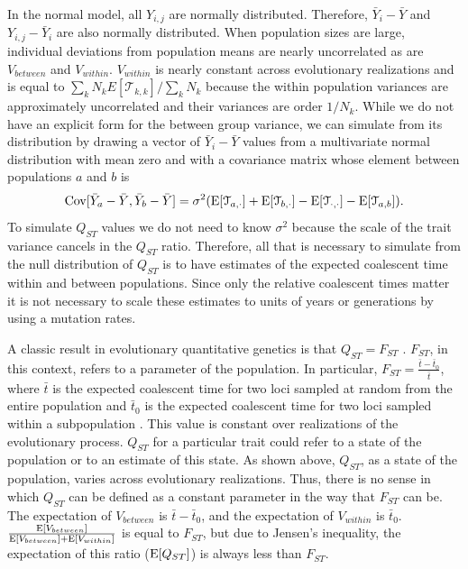 In the normal model, all $Y_{i,j}$ are normally distributed. Therefore,
$\bar{Y}_{i} - \bar{Y}$ and $Y_{i,j} - \bar{Y}_i$ are also normally distributed.
When population sizes are large, individual deviations from population means are
nearly uncorrelated as are $V_{between}$ and $V_{within}$. $V_{within}$ is
nearly constant across evolutionary realizations and is equal to $\sum_k N_k
E[\mathcal{T}_{k,k}] / \sum_k N_k$ because the within population variances are
approximately uncorrelated and their variances are order $1/N_k$. While we do
not have an explicit form for the between group variance, we can simulate from
its distribution by drawing a vector of $\bar{Y}_{i} - \bar{Y}$ values from a
multivariate normal distribution with mean zero and with a covariance matrix
whose element between populations $a$ and $b$ is 
\begin{equation}
  \mathrm{Cov}[\bar{Y}_{a} - \bar{Y}, \bar{Y}_{b} - \bar{Y}] =
  \sigma^2(\mathrm{E}[\mathcal{T}_{a,\cdot}] + \mathrm{E}[\mathcal{T}_{b,\cdot}] -
  \mathrm{E}[\mathcal{T}_{\cdot,\cdot}] - \mathrm{E}[\mathcal{T}_{a,b}]).
\end{equation}
To simulate $Q_{ST}$ values we do not need to know $\sigma^2$ because the scale
of the trait variance cancels in the $Q_{ST}$ ratio. Therefore, all that is
necessary to simulate from the null distribution of $Q_{ST}$ is to have
estimates of the expected coalescent time within and between populations. Since
only the relative coalescent times matter it is not necessary to scale these
estimates to units of years or generations by using a mutation rates.

A classic result in evolutionary quantitative genetics is that $Q_{ST}=F_{ST}$
\citep{Whitlock1999}. $F_{ST}$, in this context, refers to a parameter of the
population. In particular, $F_{ST} = \frac{\bar{t} - \bar{t}_0}{\bar{t}}$, where
$\bar{t}$ is the expected coalescent time for two loci sampled at random from
the entire population and $\bar{t}_0$ is the expected coalescent time for two
loci sampled within a subpopulation \citep{Slatkin1991}. This value is constant
over realizations of the evolutionary process. $Q_{ST}$ for a particular trait
could refer to a state of the population or to an estimate of this state. As
shown above, $Q_{ST}$, as a state of the population, varies across evolutionary
realizations. Thus, there is no sense in which $Q_{ST}$ can be defined as a
constant parameter in the way that $F_{ST}$ can be. The expectation of
$V_{between}$ is $\bar{t} - \bar{t}_0$, and the expectation of $V_{within}$ is
$\bar{t}_0$. $\frac{\mathrm{E}[V_{between}]}{\mathrm{E}[V_{between}] + \mathrm{E}[V_{within}]}$ is equal
to $F_{ST}$, but due to Jensen's inequality, the expectation of this ratio
($\mathrm{E}[Q_{ST}]$) is always less than $F_{ST}$.

